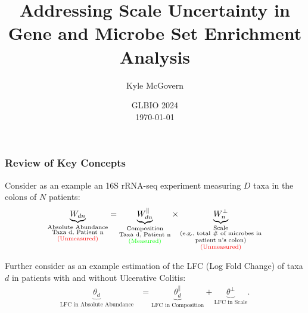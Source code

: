 \documentclass[11pt,t]{beamer}
\title[DSA Scale Uncertainty]{Addressing Scale Uncertainty in Gene and Microbe Set Enrichment Analysis}
\author[Kyle McGovern]{Kyle McGovern}
\institute[Penn State]{The Pennsylvania State University \\ \smallskip \textit{kvm6065@psu.edu}}
\date[\today]{GLBIO 2024 \\ \today}
\begin{document}

\begin{frame}
	\titlepage %
\end{frame}

\begin{frame}
    \frametitle{Review of Key Concepts}

    Consider as an example an 16S rRNA-seq experiment measuring \(D\) taxa in the colons of \(N\) patients:
    \begin{align*}
      \underbrace{W_{dn}}_{\substack{\text{Absolute Abundance} \\ \text{Taxa d, Patient n} \\ \text{\textcolor{red}{(Unmeasured)}}}} = \underbrace{W^\parallel_{dn}}_{\substack{\text{Composition} \\ \text{Taxa d, Patient n} \\ \text{\textcolor{green}{(Measured)}}}} \times \underbrace{W^\perp_n}_{\substack{\text{Scale} \\ \text{(e.g., total \# of microbes in} \\ \text{patient n's colon)} \\ \text{\textcolor{red}{(Unmeasured)}}}}
    \end{align*}

    \pause

    Further consider as an example estimation of the LFC (Log Fold Change) of taxa \(d\) in patients with and without Ulcerative Colitis:
    \begin{align*}
        \underbrace{\theta_d}_{\text{LFC in Absolute Abundance}} &= \underbrace{\theta^{\parallel}_d}_{\text{LFC in Composition}}+\underbrace{\theta^\perp}_{\text{LFC in Scale}}. \nonumber
    \end{align*}

\end{frame}
\end{document}
